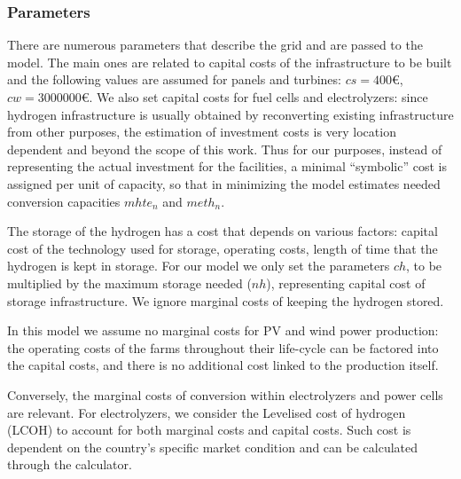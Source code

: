 \documentclass[smallextended,natbib]{svjour3}       %
\numberwithin{theorem}{section}
\begin{document}


\subsubsection{Parameters}

There are numerous parameters that describe the grid and are passed to the model. 
The main ones are related to capital costs of the infrastructure to be built and the following values are assumed for panels and turbines: $cs = 400$\euro, $cw = 3 000 000$\euro. 
We also set capital costs for fuel cells and electrolyzers: since hydrogen infrastructure is usually obtained by reconverting existing infrastructure from other purposes, the estimation of investment costs is very location dependent and beyond the scope of this work. 
Thus for our purposes, instead of representing the actual investment for the facilities, a minimal ``symbolic'' cost is assigned per unit of capacity, so that in minimizing the model estimates needed conversion capacities $mhte_n$ and $meth_n$.

The storage of the hydrogen has a cost that depends on various factors: capital cost of the technology used for storage, operating costs, length of time that the hydrogen is kept in storage.
For our model we only set the parameters $ch$, to be multiplied by the maximum storage needed ($nh$), representing capital cost of storage infrastructure. 
We ignore marginal costs of keeping the hydrogen stored.

In this model we assume no marginal costs for PV and wind power production: the operating costs of the farms throughout their life-cycle can be factored into the capital costs, and there is no additional cost linked to the production itself.

Conversely, the marginal costs of conversion within electrolyzers and power cells are relevant. 
For electrolyzers, we consider the Levelised cost of hydrogen (LCOH) to account for both marginal costs and capital costs. 
Such cost is dependent on the country's specific market condition and can be calculated through the \citet{LCOH} calculator.
\end{document}
